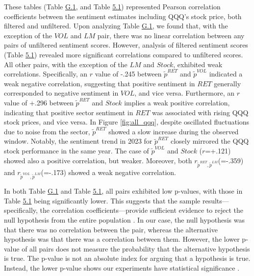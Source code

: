 \documentclass[logo,bsc,singlespacing,parskip]{infthesis}
\begin{document}
These tables (Table \hyperref[tab:all_qqq_corr1]{G.1}, and Table \hyperref[tab:all_qqq_corr2]{5.1}) represented Pearson correlation coefficients between the sentiment estimates including QQQ’s stock price, both filtered and unfiltered. Upon analyzing Table \hyperref[tab:all_qqq_corr1]{G.1}, we found that, with the exception of the $VOL$ and $LM$ pair, there was no linear correlation between any pairs of unfiltered sentiment scores. However, analysis of filtered sentiment scores (Table \hyperref[tab:all_qqq_corr2]{5.1}) revealed more significant correlations compared to unfiltered scores. All other pairs, with the exception of the $LM$ and $Stock$, exhibited weak correlations. Specifically, an $r$ value of -.245 between $\tilde{p}^{RET}$ and $\tilde{p}^{VOL}$ indicated a weak negative correlation, suggesting that positive sentiment in $RET$ generally corresponded to negative sentiment in $VOL$, and vice versa. Furthermore, an $r$ value of +.296 between $\tilde{p}^{RET}$ and $Stock$ implies a weak positive correlation, indicating that positive sector sentiment in $RET$ was associated with rising QQQ stock prices, and vice versa. In Figure \ref{fig:all_qqq}, despite oscillated fluctuations due to noise from the sector, $\tilde{p}^{RET}$ showed a slow increase during the observed window. Notably, the sentiment trend in 2023 for $\tilde{p}^{RET}$ closely mirrored the QQQ stock performance in the same year. The case of $\tilde{p}^{VOL}$ and $Stock$ ($r$=+.121) showed also a positive correlation, but weaker. Moreover, both $r_{\tilde{p}^{RET},\tilde{p}^{LM}}$(=-.359) and $r_{\tilde{p}^{VOL},\tilde{p}^{LM}}$(=-.173) showed a weak negative correlation. 


In both Table \hyperref[tab:all_qqq_corr1]{G.1} and Table \hyperref[tab:all_qqq_corr2]{5.1}, all pairs exhibited low p-values, with those in Table \hyperref[tab:all_qqq_corr2]{5.1} being significantly lower. This suggests that the sample results—specifically, the correlation coefficients—provide sufficient evidence to reject the null hypothesis from the entire population \cite{MinitabBlog2014}.  In our case, the null hypothesis was that there was no correlation between the pair, whereas the alternative hypothesis was that there was a correlation between them. However, the lower p-value of all pairs does not measure the probability that the alternative hypothesis is true. The p-value is not an absolute index for arguing that a hypothesis is true. Instead, the lower p-value shows our experiments have statistical significance \cite{FrostPValues, ASAStatement2016, Park2016}.
\end{document}
